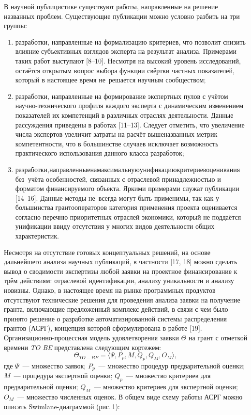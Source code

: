 В научной публицистике существуют работы, направленные на решение названных проблем. Существующие публикации можно условно разбить на три группы:
\begin{enumerate}[noitemsep]
  \item разработки, направленные на формализацию критериев, что позволит снизить влияние субъективных взглядов эксперта на результат анализа. Примерами таких работ выступают [8--10]. Несмотря на высокий уровень исследований, остаётся открытым вопрос выбора функции свёртки частных показателей, который в настоящее время не~решается научным сообществом;
  \item разработки, направленные на формирование экспертных пулов с учётом научно-технического профиля каждого эксперта с динамическим изменением показателей их компетенций в различных отраслях деятельности. Данные рассуждения приведены в работах [11--13]. Следует отметить, что увеличение числа экспертов увеличит затраты на расчёт вышеназванных метрик компетентности, что в большинстве случаев исключает возможность практического использования данного класса разработок;
  \item разработки,\;\;\;направленные\;\;на\;\;максимальную\;\;\;унификацию\;\;критериев\;\;оценивания без~учёта особенностей, связанных с отраслевой принадлежностью и форматом финансируемого объекта. Яркими примерами служат публикации [14--16]. Данные методы не~всегда могут быть применимы, так как у большинства грантооператоров категория применения проекта оценивается согласно перечню приоритетных отраслей экономики, который не поддаётся унификации ввиду отсутствия у многих видов деятельности общих характеристик.
\end{enumerate}

Несмотря на отсутствие готовых концептуальных решений, на основе дальнейшего анализа научных публикаций, в частности [17, 18] можно сделать вывод о сводимости экспертизы любой заявки на проектное финансирование к трём действиям: отраслевой идентификации, анализу уникальности и анализу новизны. Однако, в настоящее время на рынке программных продуктов отсутствуют технические решения для проведения анализа заявки на получение гранта, включающие предложенный комплекс действий, в связи с чем было принято решение о разработке автоматизированной системы распределения грантов (АСРГ), концепция которой сформулирована в работе [19]. Организационно-процессная модель удовлетворения заявки $\Theta$ на грант с отметкой времени \textit{TO BE} представлена следующим кортежем:
\begin{equation}
  \Theta_{TO-BE} = \langle \Psi, P_p, M, Q_p, Q_M, O_M \rangle,
\end{equation}
где $\Psi$~--- множество заявок; $P_p$~--- множество процедур предварительной оценки; $M$~--- процедура экспертной оценки; $Q_p$~--- множество критериев для предварительной оценки; $Q_M$~--- множество критериев для экспертной оценки; $O_M$~--- множество численных оценок. В общем виде схему работы АСРГ можно описать Swimlane-диаграммой (рис.\,1):

